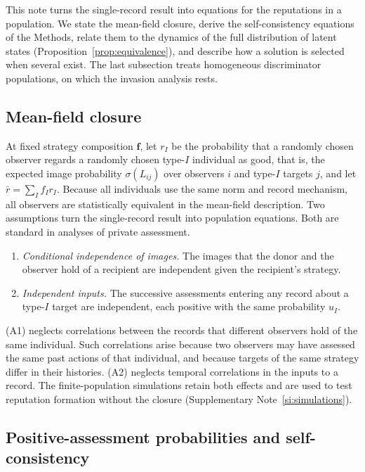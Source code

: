 \documentclass[10pt]{wlscirep}
\theoremstyle{plain}
\theoremstyle{remark}
\begin{document}
This note turns the single-record result into equations for the reputations in a population. We state the mean-field closure, derive the self-consistency equations of the Methods, relate them to the dynamics of the full distribution of latent states (Proposition~\ref{prop:equivalence}), and describe how a solution is selected when several exist. The last subsection treats homogeneous discriminator populations, on which the invasion analysis rests.

\subsection{Mean-field closure}

At fixed strategy composition $\bm f$, let $r_I$ be the probability that a randomly chosen observer regards a randomly chosen type-$I$ individual as good, that is, the expected image probability $\sigma(L_{ij})$ over observers $i$ and type-$I$ targets $j$, and let $\bar r=\sum_If_Ir_I$. Because all individuals use the same norm and record mechanism, all observers are statistically equivalent in the mean-field description. Two assumptions turn the single-record result into population equations. Both are standard in analyses of private assessment.
\begin{enumerate}
\item[(A1)] \textit{Conditional independence of images.} The images that the donor and the observer hold of a recipient are independent given the recipient's strategy.
\item[(A2)] \textit{Independent inputs.} The successive assessments entering any record about a type-$I$ target are independent, each positive with the same probability $u_I$.
\end{enumerate}
(A1) neglects correlations between the records that different observers hold of the same individual. Such correlations arise because two observers may have assessed the same past actions of that individual, and because targets of the same strategy differ in their histories. (A2) neglects temporal correlations in the inputs to a record. The finite-population simulations retain both effects and are used to test reputation formation without the closure (Supplementary Note~\ref{si:simulations}).

\subsection{Positive-assessment probabilities and self-consistency}
\end{document}
